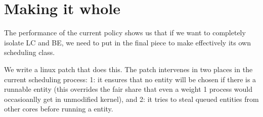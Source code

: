 
\section{Making it whole}
\label{sec:my-patch}

The performance of the current \schedidle{} policy shows us that if we want to
completely isolate LC and BE, we need to put in the final piece to make
\schedidle{} effectively its own scheduling class.

We write a linux patch that does this. The patch intervenes in two places in the
current scheduling process: 1: it ensures that no \schedidle{} entity will be
chosen if there is a runnable \schednormal{} entity (this overrides the fair
share that even a weight 1 process would occasioanlly get in unmodified kernel),
and 2: it tries to steal queued \schednormal{} entities from other cores before
running a \schedidle{} entity.

